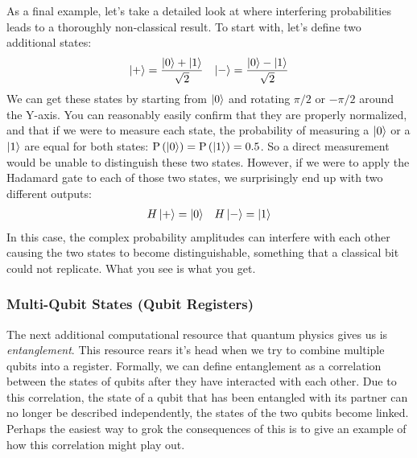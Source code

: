 As a final example, let's take a detailed look at where interfering probabilities leads to a thoroughly
non-classical result. To start with, let's define two additional states:
\begin{align}
  \ket{+} = \frac{\ket{0} + \ket{1}}{\sqrt{2}} && \ket{-} = \frac{\ket{0} - \ket{1}}{\sqrt{2}}
\end{align}
We can get these states by starting from $\ket{0}$ and rotating $\pi/2$ or $-\pi/2$ around the Y-axis. You can
reasonably easily confirm that they are properly normalized, and that if we were to measure each state, the
probability of measuring a $\ket{0}$ or a $\ket{1}$ are equal for both states: $\mathrm{P}\left(\ket{0}\right) =
\mathrm{P}\left(\ket{1}\right) = 0.5$. So a direct measurement would be unable to distinguish these two states.
However, if we were to apply the Hadamard gate to each of those two states, we surprisingly end up with two
different outputs:
\begin{align}
  H\ket{+} = \ket{0} && H\ket{-} = \ket{1}
\end{align}
In this case, the complex probability amplitudes can interfere with each other causing the two states to
become distinguishable, something that a classical bit could not replicate. What you see is what you get.

\subsubsection{Multi-Qubit States (Qubit Registers)}
The next additional computational resource that quantum physics gives us is \emph{entanglement}. This
resource rears it's head when we try to combine multiple qubits into a register. Formally,
we can define entanglement as a correlation between the states of qubits after they have interacted
with each other. Due to this correlation, the state of a qubit that has been entangled with its partner
can no longer be described independently, the states of the two qubits become linked. Perhaps the easiest
way to grok the consequences of this is to give an example of how this correlation might play out.

